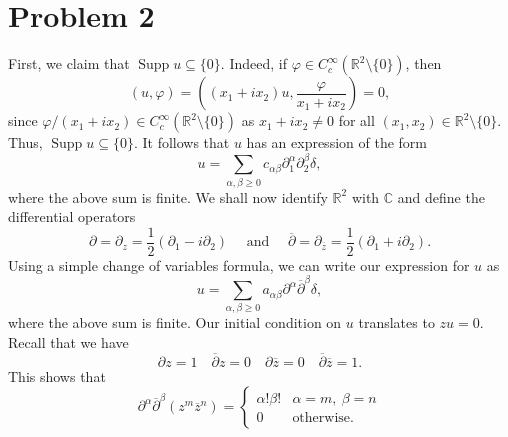 \documentclass[10pt]{amsart}
\theoremstyle{thmstyle}
\theoremstyle{defstyle}
\newcommand{\R}{\mathbb{R}}
\newcommand{\bbC}{\mathbb{C}}
\newcommand{\Supp}{\operatorname{Supp}}
\renewcommand{\ge}{\geqslant}
\begin{document}
\section{Problem 2}

First, we claim that $\Supp u\subseteq\{0\}$. Indeed, if $\varphi\in C_c^\infty(\R^2\setminus\{0\})$, then 
\begin{equation*}
    \left(u, \varphi\right) = \left((x_1 + ix_2)u, \frac{\varphi}{x_1 + ix_2}\right) = 0,
\end{equation*}
since $\varphi/(x_1 + ix_2)\in C_c^\infty(\R^2\setminus\{0\})$ as $x_1 + ix_2\ne 0$ for all $(x_1,x_2)\in\R^2\setminus\{0\}$. Thus, $\Supp u\subseteq\{0\}$. It follows that $u$ has an expression of the form 
\begin{equation*}
    u = \sum_{\alpha,\beta\ge 0}c_{\alpha\beta}\partial_1^\alpha\partial_2^\beta\delta,
\end{equation*}
where the above sum is finite. We shall now identify $\R^2$ with $\bbC$ and define the differential operators 
\begin{equation*}
    \partial = \partial_z  = \frac{1}{2}\left(\partial_1 - i\partial_2\right)\quad\text{ and }\quad\overline\partial = \partial_{\overline z} = \frac{1}{2}\left(\partial_1 + i\partial_2\right).
\end{equation*}
Using a simple change of variables formula, we can write our expression for $u$ as 
\begin{equation*}
    u = \sum_{\alpha,\beta\ge 0} a_{\alpha\beta} \partial^\alpha\overline\partial^\beta\delta,
\end{equation*}
where the above sum is finite. Our initial condition on $u$ translates to $zu = 0$. Recall that we have 
\begin{equation*}
    \partial z = 1\quad \overline\partial z = 0\quad\partial\overline z = 0\quad\overline\partial\overline z = 1.
\end{equation*}
This shows that 
\begin{equation*}
    \partial^\alpha\overline\partial^\beta (z^m\overline z^n) = 
    \begin{cases}
        \alpha!\beta! & \alpha = m,~\beta = n\\
        0 & \text{otherwise}.
    \end{cases}
\end{equation*}
\end{document}
